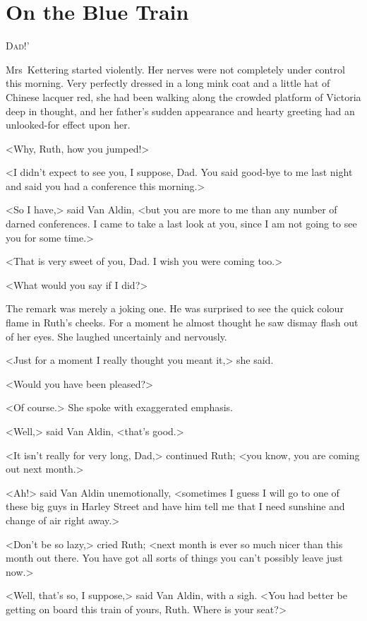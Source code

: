 \chapter{On the Blue Train}



\lettrine[ante=`]{D}{ad!}'

\zz
Mrs~Kettering started violently. Her nerves were not completely under control this morning. Very perfectly dressed in a long mink coat and a little hat of Chinese lacquer red, she had been walking along the crowded platform of Victoria deep in thought, and her father's sudden appearance and hearty greeting had an unlooked-for effect upon her.

<Why, Ruth, how you jumped!>

<I didn't expect to see you, I suppose, Dad. You said good-bye to me last night and said you had a conference this morning.>

<So I have,> said Van Aldin, <but you are more to me than any number of darned conferences. I came to take a last look at you, since I am not going to see you for some time.>

<That is very sweet of you, Dad. I wish you were coming too.>

<What would you say if I did?>

The remark was merely a joking one. He was surprised to see the quick colour flame in Ruth's cheeks. For a moment he almost thought he saw dismay flash out of her eyes. She laughed uncertainly and nervously.

<Just for a moment I really thought you meant it,> she said.

<Would you have been pleased?>

<Of course.> She spoke with exaggerated emphasis.

<Well,> said Van Aldin, <that's good.>

<It isn't really for very long, Dad,> continued Ruth; <you know, you are coming out next month.>

<Ah!> said Van Aldin unemotionally, <sometimes I guess I will go to one of these big guys in Harley Street and have him tell me that I need sunshine and change of air right away.>

<Don't be so lazy,> cried Ruth; <next month is ever so much nicer than this month out there. You have got all sorts of things you can't possibly leave just now.>

<Well, that's so, I suppose,> said Van Aldin, with a sigh. <You had better be getting on board this train of yours, Ruth. Where is your seat?>

